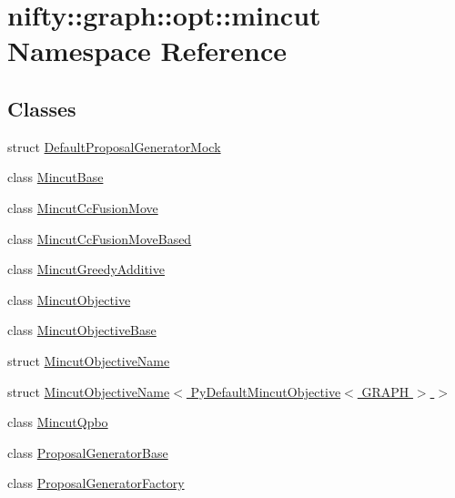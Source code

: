 \hypertarget{namespacenifty_1_1graph_1_1opt_1_1mincut}{}\section{nifty\+:\+:graph\+:\+:opt\+:\+:mincut Namespace Reference}
\label{namespacenifty_1_1graph_1_1opt_1_1mincut}
\subsection*{Classes}
\begin{DoxyCompactItemize}
\item 
struct \hyperlink{structnifty_1_1graph_1_1opt_1_1mincut_1_1DefaultProposalGeneratorMock}{Default\+Proposal\+Generator\+Mock}
\item 
class \hyperlink{classnifty_1_1graph_1_1opt_1_1mincut_1_1MincutBase}{Mincut\+Base}
\item 
class \hyperlink{classnifty_1_1graph_1_1opt_1_1mincut_1_1MincutCcFusionMove}{Mincut\+Cc\+Fusion\+Move}
\item 
class \hyperlink{classnifty_1_1graph_1_1opt_1_1mincut_1_1MincutCcFusionMoveBased}{Mincut\+Cc\+Fusion\+Move\+Based}
\item 
class \hyperlink{classnifty_1_1graph_1_1opt_1_1mincut_1_1MincutGreedyAdditive}{Mincut\+Greedy\+Additive}
\item 
class \hyperlink{classnifty_1_1graph_1_1opt_1_1mincut_1_1MincutObjective}{Mincut\+Objective}
\item 
class \hyperlink{classnifty_1_1graph_1_1opt_1_1mincut_1_1MincutObjectiveBase}{Mincut\+Objective\+Base}
\item 
struct \hyperlink{structnifty_1_1graph_1_1opt_1_1mincut_1_1MincutObjectiveName}{Mincut\+Objective\+Name}
\item 
struct \hyperlink{structnifty_1_1graph_1_1opt_1_1mincut_1_1MincutObjectiveName_3_01PyDefaultMincutObjective_3_01GRAPH_01_4_01_4}{Mincut\+Objective\+Name$<$ Py\+Default\+Mincut\+Objective$<$ G\+R\+A\+P\+H $>$ $>$}
\item 
class \hyperlink{classnifty_1_1graph_1_1opt_1_1mincut_1_1MincutQpbo}{Mincut\+Qpbo}
\item 
class \hyperlink{classnifty_1_1graph_1_1opt_1_1mincut_1_1ProposalGeneratorBase}{Proposal\+Generator\+Base}
\item 
class \hyperlink{classnifty_1_1graph_1_1opt_1_1mincut_1_1ProposalGeneratorFactory}{Proposal\+Generator\+Factory}
\item 

\end{DoxyCompactItemize}
